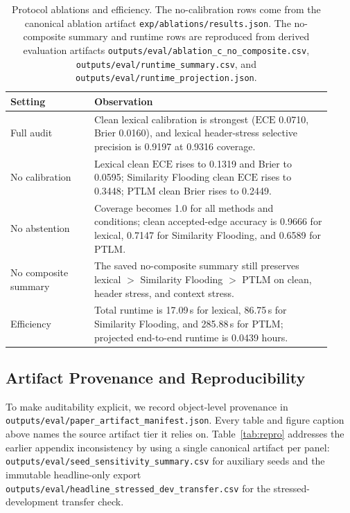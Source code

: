 \documentclass{article}
\newcommand{\ece}{\mbox{$\mathrm{ECE}$}}
\begin{document}
\begin{table}[t]
  \caption{Protocol ablations and efficiency. The no-calibration rows come from the canonical ablation artifact \texttt{exp/ablations/results.json}. The no-composite summary and runtime rows are reproduced from derived evaluation artifacts \texttt{outputs/eval/ablation\_c\_no\_composite.csv}, \texttt{outputs/eval/runtime\_summary.csv}, and \texttt{outputs/eval/runtime\_projection.json}.}
  \label{tab:ablations}
  \centering
  \small
  \begin{tabular}{p{0.24\linewidth}p{0.68\linewidth}}
    \toprule
    Setting & Observation \\
    \midrule
    Full audit & Clean lexical calibration is strongest (\ece{} 0.0710, Brier 0.0160), and lexical header-stress selective precision is 0.9197 at 0.9316 coverage. \\
    No calibration & Lexical clean \ece{} rises to 0.1319 and Brier to 0.0595; Similarity Flooding clean \ece{} rises to 0.3448; PTLM clean Brier rises to 0.2449. \\
    No abstention & Coverage becomes 1.0 for all methods and conditions; clean accepted-edge accuracy is 0.9666 for lexical, 0.7147 for Similarity Flooding, and 0.6589 for PTLM. \\
    No composite summary & The saved no-composite summary still preserves lexical $>$ Similarity Flooding $>$ PTLM on clean, header stress, and context stress. \\
    Efficiency & Total runtime is 17.09\,s for lexical, 86.75\,s for Similarity Flooding, and 285.88\,s for PTLM; projected end-to-end runtime is 0.0439 hours. \\
    \bottomrule
  \end{tabular}
\end{table}

\subsection{Artifact Provenance and Reproducibility}

To make auditability explicit, we record object-level provenance in \texttt{outputs/eval/paper\_artifact\_manifest.json}. Every table and figure caption above names the source artifact tier it relies on. Table~\ref{tab:repro} addresses the earlier appendix inconsistency by using a single canonical artifact per panel: \texttt{outputs/eval/seed\_sensitivity\_summary.csv} for auxiliary seeds and the immutable headline-only export \texttt{outputs/eval/headline\_stressed\_dev\_transfer.csv} for the stressed-development transfer check.
\end{document}
